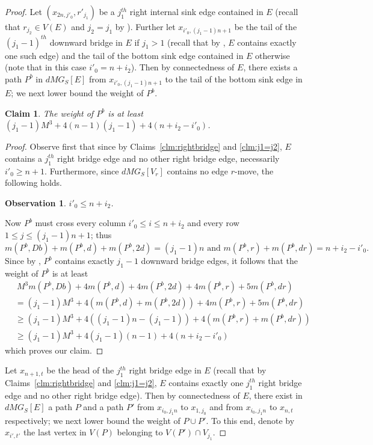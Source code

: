 \documentclass[a4paper,11pt]{article}
\theoremstyle{plain}
\newtheorem{observation}[theorem]{Observation}
\newtheorem{claim}[theorem]{Claim}
\newtheorem{identification rule}{Identification Rule}
\theoremstyle{definition}
\theoremstyle{remark}
\newenvironment{claimproof}{\begin{proof}\renewcommand{\qedsymbol}{\claimqed}}{\end{proof}\renewcommand{\qedsymbol}{\plainqed}}
\let\plainqed\qedsymbol
\newcommand{\claimqed}{$\lrcorner$}
\begin{document}
\begin{proof}
Let $(x_{2n,j'_0},r'_{j_1})$ be a $j_1^{th}$ right internal sink edge contained in $E$ (recall that $r_{j_2} \in V(E)$ and $j_2 = j_1$ by ). Further let $x_{i'_0,(j_1-1)n+1}$ be the tail of the $(j_1-1)^{th}$ downward bridge in $E$ if $j_1 >1$ (recall that by , $E$ contains exactly one such edge) and the tail of the bottom sink edge contained in $E$ otherwise (note that in this case $i'_0 = n + i_2$). Then by connectedness of $E$, there exists a path $P^b$ in $dMG_S[E]$ from $x_{i'_0,(j_1-1)n+1}$ to the tail of the bottom sink edge in $E$; we next lower bound the weight of $P^b$.

\begin{claim}
\label{clm:weightPb}
The weight of $P^b$ is at least $(j_1-1)M^3 + 4(n -1)(j_1-1) + 4(n + i_2 - i'_0)$.
\end{claim}

\begin{claimproof}
Observe first that since by Claims~\ref{clm:rightbridge} and \ref{clm:j1=j2}, $E$ contains a $j_1^{th}$ right bridge edge and no other right bridge edge, necessarily $i'_0 \geq n+1$. Furthermore, since $dMG_S[V_r]$ contains no edge $r$-move, the following holds.

\begin{observation}
\label{obs:i'0}
$i'_0 \leq n+i_2$. 
\end{observation}

\noindent
Now $P^b$ must cross every column $i'_0 \leq i \leq n + i_2$ and every row $1 \leq j \leq (j_1-1)n+1$; thus 
\[
m(P^b,Db) + m(P^b,d) + m(P^b,2d) = (j_1-1)n \text{ and } m(P^b,r) + m(P^b,dr) = n + i_2 - i'_0.
\]
Since by , $P^b$ contains exactly $j_1-1$ downward bridge edges, it follows that the weight of $P^b$ is at least 
\begin{equation*}
\begin{split}
&~M^3m(P^b,Db) + 4m(P^b,d) + 4m(P^b,2d) + 4m(P^b,r) + 5m(P^b,dr)\\
&= (j_1-1)M^3 + 4(m(P^b,d) + m(P^b,2d)) + 4m(P^b,r) + 5m(P^b,dr)\\
& \geq (j_1-1)M^3 + 4((j_1-1)n - (j_1-1)) + 4(m(P^b,r) + m(P^b,dr))\\
& \geq (j_1-1)M^3 + 4(j_1-1)(n - 1) + 4(n + i_2 - i'_0)
\end{split}
\end{equation*}
which proves our claim.
\end{claimproof}

Let $x_{n+1,t}$ be the head of the $j_1^{th}$ right bridge edge in $E$ (recall that by Claims~\ref{clm:rightbridge} and \ref{clm:j1=j2}, $E$ contains exactly one $j_1^{th}$ right bridge edge and no other right bridge edge). Then by connectedness of $E$, there exist in $dMG_S[E]$ a path $P$ and a path $P'$ from $x_{i_0,j_1n}$ to $x_{1,j_0}$ and from $x_{i_0,j_1n}$ to $x_{n,t}$ respectively; we next lower bound the weight of $P \cup P'$. To this end, denote by $x_{i',t'}$ the last vertex in $V(P)$ belonging to $V(P') \cap V_{j_1}$. 


\end{proof}
\end{document}
